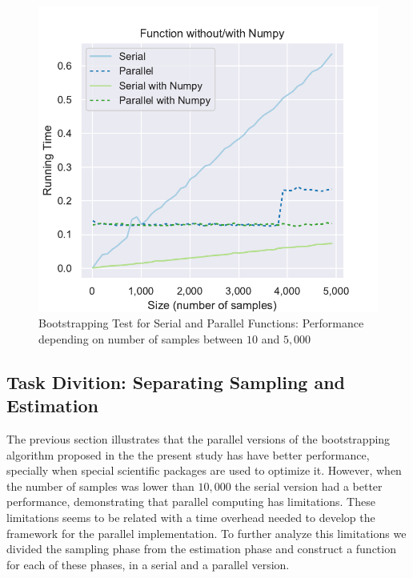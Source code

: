 \documentclass[11pt]{article}
\begin{document}
\begin{figure}[H]
    \begin{center}
        \includegraphics{serialvsparallel_small_test.pdf}
    \end{center}
    \caption{Bootstrapping Test for Serial and Parallel Functions: Performance depending on number of samples between $10$ and $5,000$}\label{fig:SerialVSParallelSmallTest}
\end{figure}

\subsection{Task Divition: Separating Sampling and Estimation}\label{subsec:task-divition:-separating-sampling-and-estimation}

The previous section illustrates that the parallel versions of the bootstrapping algorithm proposed in the the present study
has have better performance, specially when special scientific packages are used to optimize it. However, when the number
of samples was lower than $10,000$ the serial version had a better performance, demonstrating that parallel computing has
limitations. These limitations seems to be related with a time overhead needed to develop the framework
for the parallel implementation. To further analyze this limitations we divided the
sampling phase from the estimation phase and construct a function for each of these phases, in a serial and a parallel version.



\printbibliography
\end{document}
